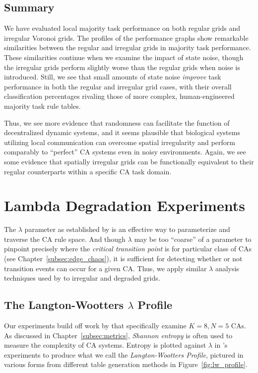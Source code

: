 \documentclass[a4paper,11pt]{report}
\begin{document}
\section{Summary}


We have evaluated local majority task performance on both regular grids and irregular Voronoi grids. The profiles of the performance graphs show remarkable similarities between the regular and irregular grids in majority task performance. These similarities continue when we examine the impact of state noise, though the irregular grids perform slightly worse than the regular grids when noise is introduced. Still, we see that small amounts of state noise \textit{improve} task performance in both the regular and irregular grid cases, with their overall classification percentages rivaling those of more complex, human-engineered majority task rule tables.

Thus, we see more evidence that randomness can facilitate the function of decentralized dynamic systems, and it seems plausible that biological systems utilizing local communication can overcome spatial irregularity and perform comparably to ``perfect'' CA systems even in noisy environments. Again, we see some evidence that spatially irregular grids can be functionally equivalent to their regular counterparts within a specific CA task domain.

\processdelayedfloats


\chapter{Lambda Degradation Experiments}
\label{ch:lambda_degen}
The $\lambda$ parameter as established by \citeauthor{la90} is an effective way to parameterize and traverse the CA rule space. And though $\lambda$ may be too ``coarse'' of a parameter to pinpoint precisely where the \textit{critical transition point} is for particular class of CAs (see Chapter~\ref{subsec:edge_chaos}), it is sufficient for detecting whether or not transition events can occur for a given CA. Thus, we apply similar $\lambda$ analysis techniques used by \citeauthor{wo90} to irregular and degraded grids.

\section{The Langton-Wootters $\lambda$ Profile}
Our experiments build off work by \citeauthor{wo90} that specifically examine $K=8, N=5$ CAs. As discussed in Chapter~\ref{subsec:metrics}, \textit{Shannon entropy} is often used to measure the complexity of CA systems. Entropy is plotted against $\lambda$ in \citeauthor{wo90}'s experiments to produce what we call the \textit{Langton-Wootters Profile}, pictured in various forms from different table generation methods in Figure~\ref{fig:lw_profile}.
\end{document}
